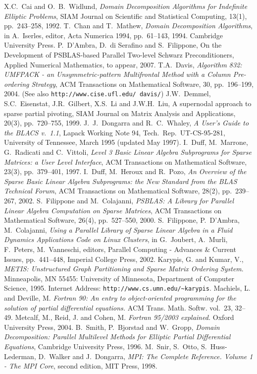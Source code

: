 \documentclass[10pt,a4paper,twoside]{article}
\begin{document}
\begin{thebibliography}{99}
%
X.C.~Cai and O.~B.~Widlund,
{\em Domain Decomposition Algorithms for Indefinite Elliptic Problems},
SIAM Journal on Scientific and Statistical Computing, 13(1), pp.~243--258, 1992.
%
T.~Chan and T.~Mathew,
{\em Domain Decomposition Algorithms},
in A.~Iserles, editor, Acta Numerica 1994, pp.~61--143, 1994.
Cambridge University Press.
%
P.~D'Ambra, D.~di Serafino and S.~Filippone,
On the Development of PSBLAS-based Parallel Two-level Schwarz Preconditioners,
Applied Numerical Mathematics, to appear, 2007.
%
T.A.~Davis, 
{\em Algorithm 832: UMFPACK - an Unsymmetric-pattern Multifrontal
Method with a Column Pre-ordering Strategy},
ACM Transactions on Mathematical Software, 30, pp.~196--199, 2004.
(See also {\tt http://www.cise.ufl.edu/~davis/})
%
J.W.~Demmel, S.C.~Eisenstat, J.R.~Gilbert, X.S.~Li and J.W.H.~Liu,
A supernodal approach to sparse partial pivoting,
SIAM Journal on Matrix Analysis and Applications, 20(3), pp.~720--755, 1999.
%
J.~J.~Dongarra and R.~C.~Whaley,
{\em A User's Guide to the BLACS v.~1.1},
Lapack Working Note 94, Tech.\ Rep.\ UT-CS-95-281, University of
Tennessee, March 1995 (updated May 1997).
%
I.~Duff, M.~Marrone, G.~Radicati and C.~Vittoli,
{\em Level 3 Basic Linear Algebra Subprograms for Sparse Matrices: 
a User Level Interface},
ACM Transactions on Mathematical Software, 23(3), pp.~379--401, 1997.
%
I.~Duff, M.~Heroux and R.~Pozo,
{\em An Overview of the Sparse Basic Linear
Algebra Subprograms: the New Standard from the BLAS Technical Forum},
ACM Transactions on Mathematical Software, 28(2), pp.~239--267, 2002.
S.~Filippone and M.~Colajanni, 
{\em PSBLAS: A Library for Parallel Linear Algebra
Computation on Sparse Matrices},
\newblock
ACM Transactions on Mathematical Software, 26(4), pp.~527--550, 2000.
%
S.~Filippone, P.~D'Ambra, M.~Colajanni,
{\em Using a Parallel Library of Sparse Linear Algebra in a Fluid Dynamics 
Applications Code on Linux Clusters},
in G.~Joubert, A.~Murli, F.~Peters, M.~Vanneschi, editors,
Parallel Computing - Advances \& Current Issues,
pp.~441--448, Imperial College Press, 2002. 
%
Karypis, G. and Kumar, V.,
{\em {METIS}: Unstructured Graph Partitioning and Sparse Matrix
  Ordering System}.
Minneapolis, MN 55455: University of Minnesota, Department of
  Computer Science, 1995. 
Internet Address: {\verb|http://www.cs.umn.edu/~karypis|}.
{Machiels, L. and Deville, M.}
{\em Fortran 90: An entry to object-oriented programming for the solution
  of partial differential equations.}
{ACM Trans. Math. Softw.} vol.~{23}, 32--49.
{Metcalf, M., Reid, J. and Cohen, M.}
{\em Fortran 95/2003 explained.}
{Oxford University Press}, 2004.
%
B.~Smith, P.~Bjorstad and W.~Gropp,
{\em Domain Decomposition: Parallel Multilevel Methods for Elliptic
Partial Differential Equations},
Cambridge University Press, 1996.
%
M.~Snir, S.~Otto, S.~Huss-Lederman, D.~Walker and J.~Dongarra,
{\em MPI: The Complete Reference. Volume 1 - The MPI Core}, second edition,
MIT Press, 1998.
%
\end{thebibliography}
\end{document}
